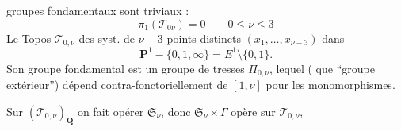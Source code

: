 groupes fondamentaux sont triviaux :
\[
\pi_1(\mathcal T_{0\nu})=0\qquad 0\leq\nu\leq3
\]
Le Topos $\mathcal T_{0,\nu}$     des syst. de $\nu-3$ points distincts $(x_1,\ldots,x_{\nu-3})$ dans
\[
\mathbf P^1-\{0,1,\infty\}=E^1\setminus\{0,1\}.
\]
Son groupe fondamental est un groupe de tresses $\Pi_{0,\nu}$, lequel ( que ``groupe extérieur'') dépend contra-fonctoriellement de $[1,\nu]$ pour les monomorphismes.

Sur $(\mathcal T_{0,\nu})_{\mathbf Q}$ on  fait opérer  $\mathfrak S_\nu$, donc $\mathfrak S_\nu\times\Gamma$ opère sur $\mathcal T_{0,\nu}$,
